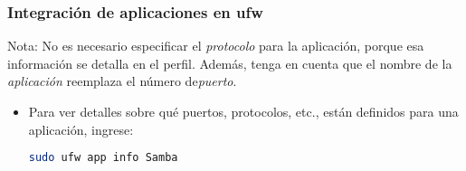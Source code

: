 \begin{frame}[fragile]
  \frametitle{Integración de aplicaciones en ufw}

  \begin{block}{Nota:}
    No es necesario especificar el \emph{protocolo} para la aplicación,
    porque esa información se detalla en el perfil. Además, tenga en cuenta
    que el nombre de la \emph{aplicación} reemplaza el número
    de\emph{puerto}.
  \end{block}

  \begin{itemize}
    \item Para ver detalles sobre qué puertos, protocolos, etc.,
      están definidos para una aplicación, ingrese:
      \begin{lstlisting}[language=Bash,numbers=none]
sudo ufw app info Samba
      \end{lstlisting}
  \end{itemize}
\end{frame}


